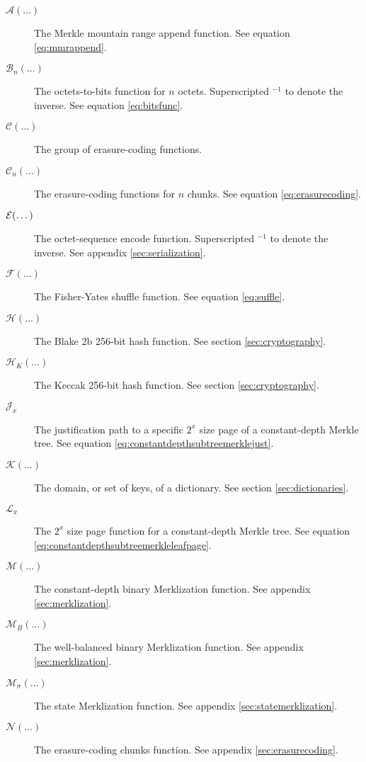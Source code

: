 \begin{description}
  \item[$\mathcal{A}(\dots)$] The Merkle mountain range append function. See equation \ref{eq:mmrappend}.
  \item[$\mathcal{B}_n(\dots)$] The octets-to-bits function for $n$ octets. Superscripted ${}^{-1}$ to denote the inverse. See equation \ref{eq:bitsfunc}.
  \item[$\mathcal{C}(\dots)$] The group of erasure-coding functions.
  \item[$\mathcal{C}_n(\dots)$] The erasure-coding functions for $n$ chunks. See equation \ref{eq:erasurecoding}.
  \item[$\mathcal{E}(\dots)$] The octet-sequence encode function. Superscripted ${}^{-1}$ to denote the inverse. See appendix \ref{sec:serialization}.
  \item[$\mathcal{F}(\dots)$] The Fisher-Yates shuffle function. See equation \ref{eq:suffle}.
  \item[$\mathcal{H}(\dots)$] The Blake 2b 256-bit hash function. See section \ref{sec:cryptography}.
  \item[$\mathcal{H}_K(\dots)$] The Keccak 256-bit hash function. See section \ref{sec:cryptography}.
  \item[$\mathcal{J}_x$] The justification path to a specific $2^x$ size page of a constant-depth Merkle tree. See equation \ref{eq:constantdepthsubtreemerklejust}.
  \item[$\mathcal{K}(\dots)$] The domain, or set of keys, of a dictionary. See section \ref{sec:dictionaries}.
  \item[$\mathcal{L}_x$] The $2^x$ size page function for a constant-depth Merkle tree. See equation \ref{eq:constantdepthsubtreemerkleleafpage}.
  \item[$\mathcal{M}(\dots)$] The constant-depth binary Merklization function. See appendix \ref{sec:merklization}.
  \item[$\mathcal{M}_B(\dots)$] The well-balanced binary Merklization function. See appendix \ref{sec:merklization}.
  \item[$\mathcal{M}_\sigma(\dots)$] The state Merklization function. See appendix \ref{sec:statemerklization}.
  \item[$\mathcal{N}(\dots)$] The erasure-coding chunks function. See appendix \ref{sec:erasurecoding}.

\end{description}
